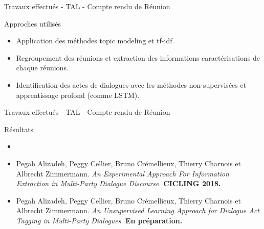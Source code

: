 \documentclass{beamer}
\begin{document}
{{\begin{frame}{Travaux effectués - TAL - Compte rendu de Réunion }
\begin{block}{Approches utilisés}
\begin{itemize}
	\item Application des méthodes topic modeling et tf-idf.
	\item Regroupement des réunions et extraction des informations caractérisations de chaque réunions. 
	\item Identification des actes de dialogues avec les méthodes non-supervisées et apprentissage profond (comme LSTM).
\end{itemize}
\end{block}
\end{frame}


\begin{frame}{Travaux effectués - TAL - Compte rendu de Réunion }

\begin{block}{Résultats}
\begin{itemize}
\item
\end{itemize}
\end{block}

\begin{itemize}
\small
\item Pegah Alizadeh, Peggy Cellier, Bruno Crémellieux, Thierry Charnois et Albrecht Zimmermann. \textit{An Experimental Approach For Information Extraction in Multi-Party Dialogue Discourse}. \textbf{CICLING 2018.}
\item Pegah Alizadeh, Peggy Cellier, Bruno Crémellieux, Thierry Charnois et Albrecht Zimmermann. \textit{An Unsupervised Learning Approach for Dialogue Act Tagging in Multi-Party Dialogues}. \textbf{En préparation.}
\end{itemize}

\end{frame}

}}
\end{document}
